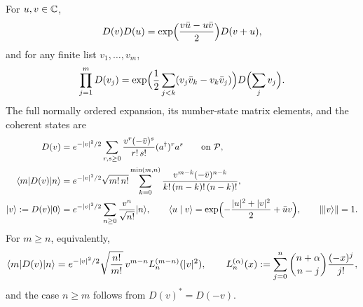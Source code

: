 \begin{theorem}\label{thm:Dcomposition}
For $u,v\in\mathbb{C}$,
\begin{equation}\label{eq:Dproduct}
 D(v)D(u)=\exp\Bigl(\frac{v\bar u-u\bar v}{2}\Bigr)D(v+u),
\end{equation}
and for any finite list $v_1,\ldots,v_m$,
\begin{equation}\label{eq:Dmany}
 \prod_{j=1}^mD(v_j)=\exp\Bigl(\frac12\sum_{j<k}(v_j\bar v_k-v_k\bar v_j)\Bigr)
 D\Bigl(\sum_jv_j\Bigr).
\end{equation}
The full normally ordered expansion, its number-state matrix elements, and
the coherent states are
\begin{align}
 D(v)&=e^{-|v|^2/2}\sum_{r,s\geq0}\frac{v^r(-\bar v)^s}{r!\,s!}(a^\dagger)^ra^s
 \qquad\text{on }\mathcal P,\label{eq:Dall}\\
 \langle m\rvert D(v)\lvert n\rangle&=e^{-|v|^2/2}\sqrt{m!\,n!}
 \sum_{k=0}^{\min(m,n)}\frac{v^{m-k}(-\bar v)^{n-k}}{k!\,(m-k)!\,(n-k)!},\label{eq:Dmatrix}\\
 \lvert v\rangle:=D(v)\lvert0\rangle&=e^{-|v|^2/2}\sum_{n\geq0}\frac{v^n}{\sqrt{n!}}\lvert n\rangle,
 \qquad\langle u\mid v\rangle=\exp\Bigl(-\frac{|u|^2+|v|^2}2+\bar uv\Bigr),\qquad\left\lVert\lvert v\rangle\right\rVert=1.
 \label{eq:coherent}
\end{align}
For $m\geq n$, equivalently,
\begin{equation}\label{eq:laguerre}
 \langle m\rvert D(v)\lvert n\rangle=e^{-|v|^2/2}\sqrt{\frac{n!}{m!}}\,v^{m-n}L_n^{(m-n)}(|v|^2),
 \qquad L_n^{(\alpha)}(x):=\sum_{j=0}^n\binom{n+\alpha}{n-j}\frac{(-x)^j}{j!},
\end{equation}
and the case $n\geq m$ follows from $D(v)^*=D(-v)$.
\end{theorem}
